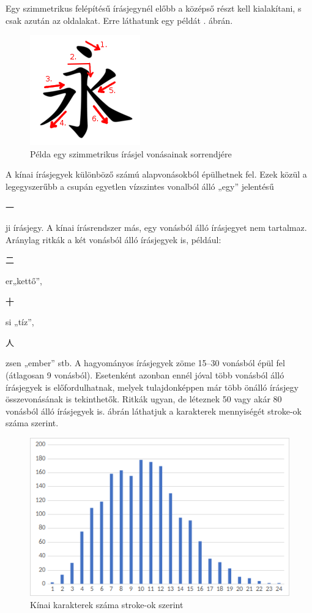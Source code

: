 Egy szimmetrikus felépítésű írásjegynél előbb a középső részt kell kialakítani, s csak azután az oldalakat. Erre láthatunk egy példát . ábrán.

\begin{figure}[h]
	\centering
	\includegraphics[scale=1.0]{images/vonasrend_ordered.png}
	\caption{Példa egy szimmetrikus írásjel vonásainak sorrendjére}
	\label{fig:sorrend_pelda}
\end{figure}

A kínai írásjegyek különböző számú alapvonásokból épülhetnek fel. Ezek közül a legegyszerűbb a csupán egyetlen vízszintes vonalból álló „egy” jelentésű \begin{CJK*}{UTF8}{gbsn}
一
\end{CJK*} ji írásjegy. A kínai írásrendszer más, egy vonásból álló írásjegyet nem tartalmaz. Aránylag ritkák a két vonásból álló írásjegyek is, például: \begin{CJK*}{UTF8}{gbsn}
二
\end{CJK*} er„kettő”,
\begin{CJK*}{UTF8}{gbsn}
十
\end{CJK*} si „tíz”,
\begin{CJK*}{UTF8}{gbsn}
人
\end{CJK*} zsen „ember” stb. A hagyományos írásjegyek zöme 15–30 vonásból épül fel (átlagosan 9 vonásból). Esetenként azonban ennél jóval több vonásból álló írásjegyek is előfordulhatnak, melyek tulajdonképpen már több önálló írásjegy összevonásának is tekinthetők. Ritkák ugyan, de léteznek 50 vagy akár 80 vonásból álló írásjegyek is. ábrán láthatjuk a karakterek mennyiségét stroke-ok száma szerint.

\begin{figure}[h]
\includegraphics[scale=0.85]{images/chinese_char_by_strokes}
\centering
\caption{Kínai karakterek száma stroke-ok szerint}
\label{fig:char_numbers}
\end{figure}

